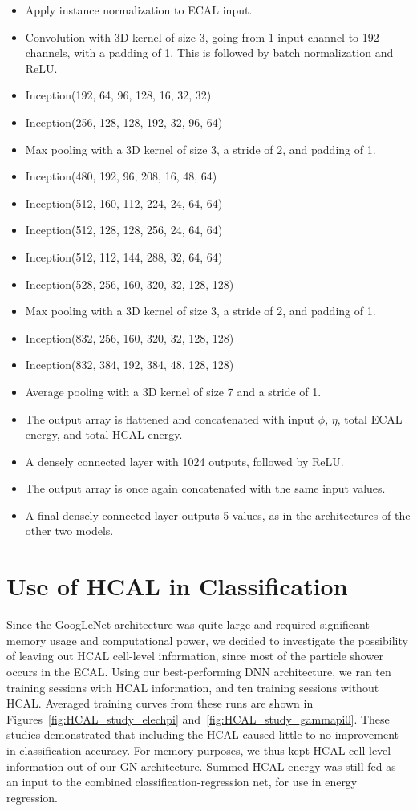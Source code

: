 \begin{itemize}
    \item Apply instance normalization to ECAL input.
    \item Convolution with 3D kernel of size 3, going from 1 input channel to 192 channels, with a padding of 1. This is followed by batch normalization and ReLU.
    \item Inception(192,  64,  96, 128, 16, 32, 32)
    \item Inception(256, 128, 128, 192, 32, 96, 64)
    \item Max pooling with a 3D kernel of size 3, a stride of 2, and padding of 1.
    \item Inception(480, 192,  96, 208, 16,  48,  64)
    \item Inception(512, 160, 112, 224, 24,  64,  64)
    \item Inception(512, 128, 128, 256, 24,  64,  64)
    \item Inception(512, 112, 144, 288, 32,  64,  64)
    \item Inception(528, 256, 160, 320, 32, 128, 128)
    \item Max pooling with a 3D kernel of size 3, a stride of 2, and padding of 1.
    \item Inception(832, 256, 160, 320, 32, 128, 128)
    \item Inception(832, 384, 192, 384, 48, 128, 128)
    \item Average pooling with a 3D kernel of size 7 and a stride of 1.
    \item The output array is flattened and concatenated with input $\phi$, $\eta$, total ECAL energy, and total HCAL energy.
    \item A densely connected layer with 1024 outputs, followed by ReLU.
    \item The output array is once again concatenated with the same input values.
    \item A final densely connected layer outputs 5 values, as in the architectures of the other two models.
\end{itemize}

\section{Use of HCAL in Classification}\label{app:classification_HCAL}

Since the GoogLeNet architecture was quite large and required significant memory usage and computational power, we decided to investigate the possibility of leaving out HCAL cell-level information, since most of the particle shower occurs in the ECAL. Using our best-performing DNN architecture, we ran ten training sessions with HCAL information, and ten training sessions without HCAL. Averaged training curves from these runs are shown in Figures~\ref{fig:HCAL_study_elechpi} and~\ref{fig:HCAL_study_gammapi0}. These studies demonstrated that including the HCAL caused little to no improvement in classification accuracy. For memory purposes, we thus kept HCAL cell-level information out of our GN architecture. Summed HCAL energy was still fed as an input to the combined classification-regression net, for use in energy regression.

